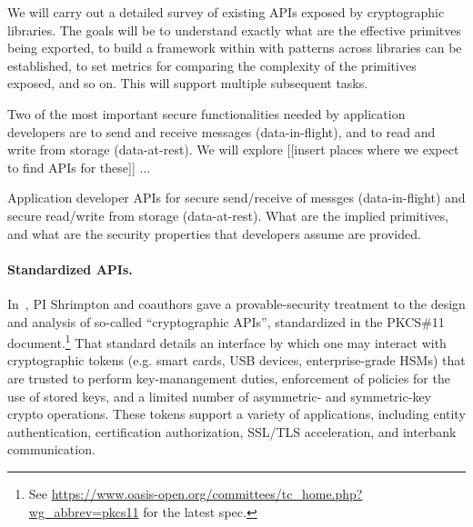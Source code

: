 \begin{task}
  We will carry out a detailed survey of existing APIs exposed by
  cryptographic libraries.  The goals will be to understand exactly
  what are the effective primitves being exported, to build a
  framework within with patterns across libraries can be established,
  to set metrics for comparing the complexity of the primitives
  exposed, and so on.  This will support multiple subsequent
  tasks.
\end{task}

Two of the most important secure functionalities needed by application
developers are to send and receive messages (data-in-flight), and to
read and write from storage (data-at-rest).  We will explore [[insert
places where we expect to find APIs for these]] ...

\begin{task}
Application developer APIs for secure send/receive of messges
(data-in-flight) and secure read/write from storage (data-at-rest).  What are
the implied primitives, and what are the security properties that developers
assume are provided.
\end{task}

\paragraph{Standardized APIs. }
%
In~\cite{SSW}, PI Shrimpton and coauthors gave a provable-security treatment to
the design and analysis of so-called ``cryptographic APIs'', standardized in the
PKCS\#11 document.\footnote{See
\url{https://www.oasis-open.org/committees/tc_home.php?wg_abbrev=pkcs11} for the
latest spec.} That standard details an interface by which one may interact with
cryptographic tokens (e.g. smart cards, USB devices, enterprise-grade HSMs) that
are trusted to perform key-manangement duties, enforcement of policies for the
use of stored keys, and a limited number of asymmetric- and symmetric-key crypto
operations.  These tokens support a variety of applications, including entity
authentication, certification authorization, SSL/TLS acceleration, and interbank
communication.
%

